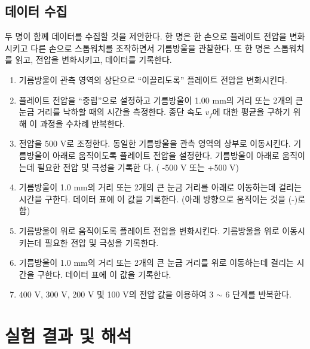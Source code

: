 \documentclass[a4paper, 10pt, nanum]{CSUniSchoolLabReport}
\begin{document}
\subsection{데이터 수집}

	두 명이 함께 데이터를 수집할 것을 제안한다. 한 명은 한 손으로 플레이트 전압을 변화시키고 다른 손으로 스톱워치를 조작하면서 기름방울을 관찰한다. 또 한 명은 스톱워치를 읽고, 전압을 변화시키고, 데이터를 기록한다. 

\begin{enumerate}[label=\arabic*.]
	\item 기름방울이 관측 영역의 상단으로 “이끌리도록” 플레이트 전압을 변화시킨다. 
	\item 플레이트 전압을 “중립”으로 설정하고 기름방울이 1.00 mm의 거리 또는 2개의 큰 눈금 거리를 낙하할 때의 시간을 측정한다. 종단 속도 $v_f$에 대한 평균을 구하기 위해 이 과정을 수차례 반복한다.
	\item 전압을 500 V로 조정한다. 동일한 기름방울을 관측 영역의 상부로 이동시킨다. 기름방울이 아래로 움직이도록 플레이트 전압을 설정한다. 기름방울이 아래로 움직이는데 필요한 전압 및 극성을 기록한	다. ( -500 V 또는 +500 V)
	\item 기름방울이 1.0 mm의 거리 또는 2개의 큰 눈금 거리를 아래로 이동하는데 걸리는 시간을 구한다. 데이터 표에 이 값을 기록한다. (아래 방향으로 움직이는 것을 (-)로 함)
	\item 기름방울이 위로 움직이도록 플레이트 전압을 변화시킨다. 기름방울을 위로 이동시키는데 필요한 전압 및 극성을 기록한다.
	\item 기름방울이 1.0 mm의 거리 또는 2개의 큰 눈금 거리를 위로 이동하는데 걸리는 시간을 구한다. 데이터 표에 이 값을 기록한다.
	\item 400 V, 300 V, 200 V 및 100 V의 전압 값을 이용하여 3 $\sim$ 6 단계를 반복한다.

\end{enumerate}


\section{실험 결과 및 해석}

\end{document}
